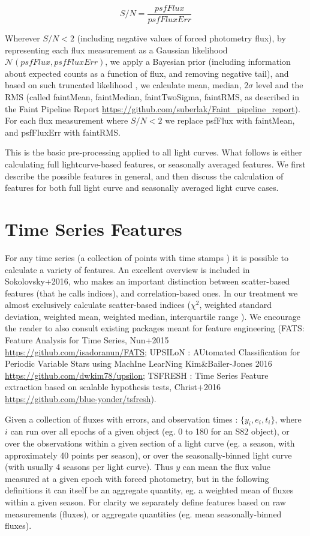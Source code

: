 \documentclass[fleqn,usenatbib]{mnras}  %
\begin{document}
\begin{equation}
S/N = \frac{psfFlux} {psfFluxErr} 
\end{equation}

Wherever $S/N < 2 $ (including negative values of forced photometry flux), by representing each flux measurement as a Gaussian likelihood   $\mathcal{N}(psfFlux, psfFluxErr)$, we apply a Bayesian prior (including information about expected counts as a function of flux, and removing negative tail), and based on such truncated likelihood , we calculate mean, median, $2 \sigma$ level and the RMS (called faintMean, faintMedian, faintTwoSigma, faintRMS, as described  in the Faint Pipeline Report \url{https://github.com/suberlak/Faint_pipeline_report}).  For each flux measurement where $S/N < 2 $  we replace psfFlux with faintMean, and psfFluxErr with faintRMS. 

This is the basic pre-processing applied  to all light curves.  What follows is either calculating full lightcurve-based features, or seasonally averaged features.  We first describe  the possible features in general, and then discuss the calculation of features for both full light curve and seasonally averaged light curve cases. 


\section{Time Series Features}
\label{sec:features}
For any time series (a collection of points with time stamps ) it is possible to calculate a variety of features. An excellent overview is included in Sokolovsky+2016, who makes an important distinction between scatter-based features (that he calls indices), and correlation-based ones. In our treatment we almost exclusively calculate scatter-based indices ($\chi^{2}$, weighted standard deviation, weighted mean, weighted median, interquartile range ). We encourage the reader to also consult existing packages meant for feature engineering (FATS: Feature Analysis for Time Series, Nun+2015 \url{https://github.com/isadoranun/FATS};  UPSILoN : AUtomated Classification for Periodic Variable Stars using MachIne LearNing Kim\&Bailer-Jones 2016 \url{https://github.com/dwkim78/upsilon};  TSFRESH : Time Series Feature extraction based on scalable hypothesis tests,  Christ+2016 \url{https://github.com/blue-yonder/tsfresh}). 

Given a collection of fluxes with errors, and observation times : $\{ y_{i}, e_{i}, t_{i} \}$, where $i$ can run over all epochs of a given object (eg. 0 to 180 for an S82 object), or over the observations within a given section of a light curve (eg. a season, with approximately 40 points per season), or over the seasonally-binned light curve (with usually 4 seasons per light curve). 
Thus $y$ can mean the flux value measured at a given epoch with forced photometry, but in the following definitions it can itself be an aggregate quantity, eg. a weighted mean of fluxes within a given season.  For clarity we separately define features based on raw measurements (fluxes), or aggregate quantities (eg. mean seasonally-binned fluxes).  
\end{document}
